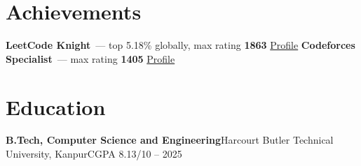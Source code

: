 \documentclass[10pt,a4paper]{article}
\newcommand{\sep}{\;\textbar\;}
\begin{document}
\section{Achievements}
\textbf{LeetCode Knight}~--- top 5.18\% globally, max rating \textbf{1863}\sep
\href{https://leetcode.com/u/vikas107sharma/}{Profile}\sep
\textbf{Codeforces Specialist}~--- max rating \textbf{1405}\sep
\href{https://codeforces.com/profile/vikas1141sharma}{Profile}

\section{Education}
\textbf{B.Tech, Computer Science and Engineering}\sep Harcourt Butler Technical University, Kanpur\sep CGPA 8.13/10\sep 2021 -- 2025
\end{document}
